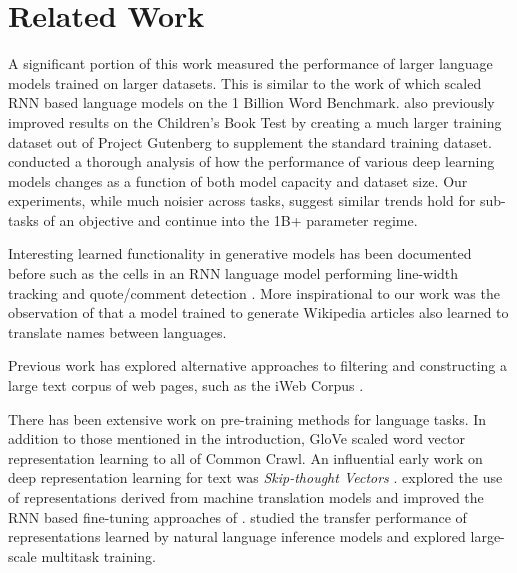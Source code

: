 \documentclass{article}
\begin{document}

\section{Related Work}
A significant portion of this work measured the performance of larger language models trained on larger datasets. This is similar to the work of \citet{jozefowicz2016exploring} which scaled RNN based language models on the 1 Billion Word Benchmark. \citet{bajgar2016embracing} also previously improved results on the Children's Book Test by creating a much larger training dataset out of Project Gutenberg to supplement the standard training dataset. \citet{hestness2017deep} conducted a thorough analysis of how the performance of various deep learning models changes as a function of both model capacity and dataset size. Our experiments, while much noisier across tasks, suggest similar trends hold for sub-tasks of an objective and continue into the 1B+ parameter regime.

Interesting learned functionality in generative models has been documented before such as the cells in an RNN language model performing line-width tracking and quote/comment detection \citet{karpathy2015visualizing}. More inspirational to our work was the observation of \citet{liu2018generating} that a model trained to generate Wikipedia articles also learned to translate names between languages.

Previous work has explored alternative approaches to filtering and constructing a large text corpus of web pages, such as the iWeb Corpus \cite{davies2018iweb}.

There has been extensive work on pre-training methods for language tasks. In addition to those mentioned in the introduction, GloVe \cite{pennington2014glove} scaled word vector representation learning to all of Common Crawl. An influential early work on deep representation learning for text was \textit{Skip-thought Vectors} \cite{kiros2015skip}. \citet{mccann2017learned} explored the use of representations derived from machine translation models and \citet{howard2018universal} improved the RNN based fine-tuning approaches of \cite{dai2015semi}. \cite{conneau2017supervised} studied the transfer performance of representations learned by natural language inference models and \cite{subramanian2018learning} explored large-scale multitask training.
\end{document}
